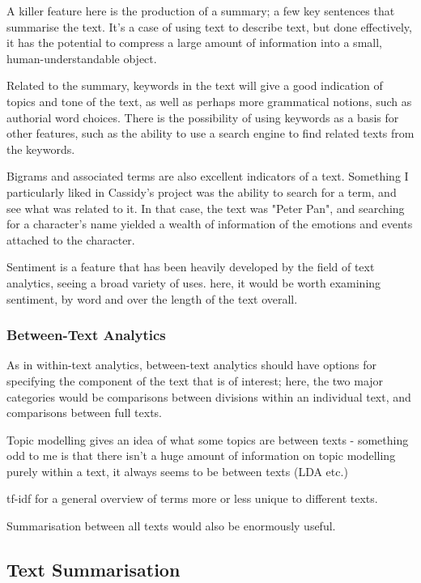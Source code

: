 \documentclass[11pt]{article}
\begin{document}
A killer feature here is the production of a summary; a few key
sentences that summarise the text. It's a case of using text to describe
text, but done effectively, it has the potential to compress a large
amount of information into a small, human-understandable object.

Related to the summary, keywords in the text will give a good indication
of topics and tone of the text, as well as perhaps more grammatical
notions, such as authorial word choices. There is the possibility of
using keywords as a basis for other features, such as the ability to use
a search engine to find related texts from the keywords.

Bigrams and associated terms are also excellent indicators of a text.
Something I particularly liked in Cassidy's project was the ability to
search for a term, and see what was related to it. In that case, the
text was "Peter Pan", and searching for a character's name yielded a
wealth of information of the emotions and events attached to the
character.

Sentiment is a feature that has been heavily developed by the field of
text analytics, seeing a broad variety of uses. here, it would be worth
examining sentiment, by word and over the length of the text overall.

\subsubsection{Between-Text Analytics}
\label{sec:org1272b59}
As in within-text analytics, between-text analytics should have options
for specifying the component of the text that is of interest; here, the
two major categories would be comparisons between divisions within an
individual text, and comparisons between full texts.

Topic modelling gives an idea of what some topics are between texts -
something odd to me is that there isn't a huge amount of information on
topic modelling purely within a text, it always seems to be between
texts (LDA etc.)

tf-idf for a general overview of terms more or less unique to different
texts.

Summarisation between all texts would also be enormously useful.

\subsection{Text Summarisation}
\label{sec:org6d9eb1e}
\end{document}
